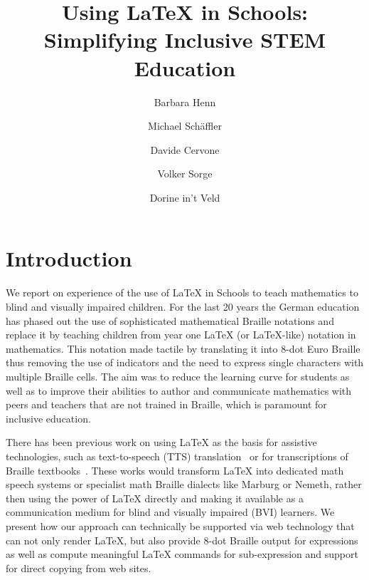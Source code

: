 \documentclass{easychair}
\begin{document}
\title{Using {\LaTeX} in Schools: Simplifying Inclusive STEM Education}

\author[1]{Barbara Henn\and Michael Schäffler\and Davide Cervone \and Volker Sorge\and
  Dorine in't Veld}

\maketitle


\section{Introduction}\label{sec:intro}

We report on experience of the use of {\LaTeX} in Schools to teach mathematics
to blind and visually impaired children. For the last 20 years the German
education has phased out the use of sophisticated mathematical Braille notations
and replace it by teaching children from year one {\LaTeX} (or {\LaTeX}-like)
notation in mathematics. This notation made tactile by translating it into 8-dot
Euro Braille thus removing the use of indicators and the need to express single
characters with multiple Braille cells. The aim was to reduce the learning curve
for students as well as to improve their abilities to author and communicate
mathematics with peers and teachers that are not trained in Braille, which is
paramount for inclusive education.

There has been previous work on using {\LaTeX} as the basis for assistive
technologies, such as text-to-speech (TTS) translation~\cite{raman1994aster} or
for transcriptions of Braille textbooks~\cite{murillo2016latex}. These works
would transform {\LaTeX} into dedicated math speech systems or specialist math
Braille dialects like Marburg or Nemeth, rather then using the power of {\LaTeX}
directly and making it available as a communication medium for blind and
visually impaired (BVI) learners. We present how our approach can technically be
supported via web technology that can not only render {\LaTeX}, but also provide
8-dot Braille output for expressions as well as compute meaningful {\LaTeX}
commands for sub-expression and support for direct copying from web sites.
\end{document}

